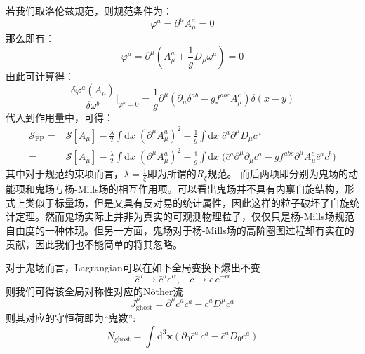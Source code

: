 若我们取洛伦兹规范，则规范条件为：
\begin{equation}
	\varphi^a=\partial^\mu A_\mu^a=0
\end{equation}
那么即有：
\begin{equation}
	\varphi^a=\partial^\mu(A_\mu^a+\frac{1}{g}D_\mu\omega^a)=0
\end{equation}
由此可计算得：
\begin{equation}
	\frac{\delta\varphi^a(A_\mu)}{\delta \omega^b}\Big|_{\varphi^a=0}=\frac{1}{g}\partial^\mu (\partial_\mu\delta^{ab}-gf^{abc}A_\mu^c)\delta(x-y)
\end{equation}
代入到作用量中，可得：
\begin{equation}
	\begin{split}
		\mathcal{S}_{\text{FP}}=&\mathcal{S}[A_\mu]-\frac{\lambda}{2}\int\mathrm{d}x\;(\partial^\mu A_\mu^a)^2-\frac{1}{g}\int\mathrm{d}x\;\bar{ c}^a\partial^\mu D_\mu c^a\\
		=&\mathcal{S}[A_\mu]-\frac{\lambda}{2}\int\mathrm{d}x\;(\partial^\mu A_\mu^a)^2-\frac{1}{g}\int\mathrm{d}x\;\Big(\bar{ c}^a\partial^\mu\partial_\mu c^a-gf^{abc}\partial^\mu A_\mu^c\bar{ c}^a  c^b\Big)
	\end{split}
\end{equation}
其中对于规范约束项而言，$\lambda=\frac{1}{\xi}$即为所谓的$R_\xi$规范。
而后两项即分别为鬼场的动能项和鬼场与杨-Mills场的相互作用项。可以看出鬼场并不具有内禀自旋结构，形式上类似于标量场，但是又具有反对易的统计属性，因此这样的粒子破坏了自旋统计定理。然而鬼场实际上并非为真实的可观测物理粒子，仅仅只是杨-Mills场规范自由度的一种体现。但另一方面，鬼场对于杨-Mills场的高阶圈图过程却有实在的贡献，因此我们也不能简单的将其忽略。

对于鬼场而言，Lagrangian可以在如下全局变换下爆出不变
\begin{equation}
    \bar{c}^a\rightarrow\bar{c}^a e^\alpha,~~~~c\rightarrow c\, e^{-\alpha}
\end{equation}
则我们可得该全局对称性对应的Nöther流
\begin{equation}
    J^\mu _\text{ghost} = \partial^\mu \bar{c}^a c^a-\bar{c}^aD^\mu c^a
\end{equation}
则其对应的守恒荷即为“鬼数”:
\begin{equation}
    N_\text{ghost} = \int\mathrm{d}^3\boldsymbol{x}(\partial_0 \bar{c}^a\, c^a - \bar{c}^a D_0c^a)
\end{equation}

